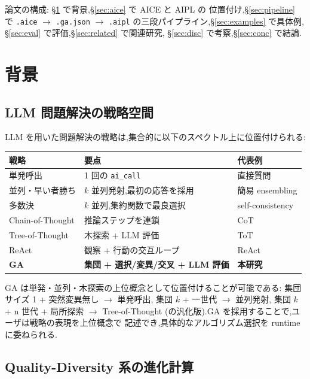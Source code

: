 \documentclass[11pt,a4paper]{article}
\newcommand{\code}[1]{\texttt{\small #1}}
\begin{document}
論文の構成: \S\ref{sec:bg} で背景,\S\ref{sec:aice} で AICE と AIPL の
位置付け,\S\ref{sec:pipeline} で \code{.aice} $\to$ \code{.ga.json}
$\to$ \code{.aipl} の三段パイプライン,\S\ref{sec:examples} で具体例,
\S\ref{sec:eval} で評価,\S\ref{sec:related} で関連研究,
\S\ref{sec:disc} で考察,\S\ref{sec:conc} で結論.

\section{背景}
\label{sec:bg}

\subsection{LLM 問題解決の戦略空間}

LLM を用いた問題解決の戦略は,集合的に以下のスペクトル上に位置付けられる:

\begin{tabularx}{\linewidth}{l X l}
  \toprule
  \textbf{戦略} & \textbf{要点} & \textbf{代表例} \\
  \midrule
  単発呼出       & 1 回の \code{ai\_call}                  & 直接質問 \\
  並列・早い者勝ち & $k$ 並列発射,最初の応答を採用            & 簡易 ensembling \\
  多数決         & $k$ 並列,集約関数で最良選択               & self-consistency \cite{wang2022selfconsistency} \\
  Chain-of-Thought & 推論ステップを連鎖                       & CoT \cite{wei2022cot} \\
  Tree-of-Thought & 木探索 + LLM 評価                         & ToT \cite{yao2023tot} \\
  ReAct          & 観察 + 行動の交互ループ                    & ReAct \cite{yao2022react} \\
  \textbf{GA}    & \textbf{集団 + 選択/変異/交叉 + LLM 評価} & \textbf{本研究}\\
  \bottomrule
\end{tabularx}

GA は単発・並列・木探索の上位概念として位置付けることが可能である:
集団サイズ 1 + 突然変異無し $\to$ 単発呼出, 集団 $k$ + 一世代 $\to$
並列発射, 集団 $k$ + n 世代 + 局所探索 $\to$ Tree-of-Thought
(の汎化版).GA を採用することで,ユーザは戦略の表現を上位概念で
記述でき,具体的なアルゴリズム選択を runtime に委ねられる.

\subsection{Quality-Diversity 系の進化計算}
\end{document}
